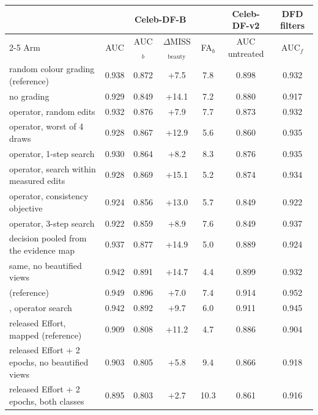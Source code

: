 \begin{tabular}{@{}l cccc c c@{}}
\toprule
 & \multicolumn{4}{c}{Celeb-DF-B} & Celeb-DF-v2 & DFD filters \\
\cmidrule(lr){2-5}
Arm & AUC & AUC$_b$ & $\Delta$MISS$_\text{beauty}$ & FA$_b$ & AUC untreated & AUC$_f$ \\
\midrule
random colour grading (reference) & 0.938 & 0.872 & +7.5 & 7.8 & 0.898 & 0.932 \\
no grading & 0.929 & 0.849 & +14.1 & 7.2 & 0.880 & 0.917 \\
operator, random edits & 0.932 & 0.876 & +7.9 & 7.7 & 0.873 & 0.932 \\
operator, worst of 4 draws & 0.928 & 0.867 & +12.9 & 5.6 & 0.860 & 0.935 \\
operator, 1-step search & 0.930 & 0.864 & +8.2 & 8.3 & 0.876 & 0.935 \\
operator, search within measured edits & 0.928 & 0.869 & +15.1 & 5.2 & 0.874 & 0.934 \\
operator, consistency objective & 0.924 & 0.856 & +13.0 & 5.7 & 0.849 & 0.922 \\
operator, 3-step search & 0.922 & 0.859 & +8.9 & 7.6 & 0.849 & 0.937 \\
decision pooled from the evidence map & 0.937 & 0.877 & +14.9 & 5.0 & 0.889 & 0.924 \\
same, no beautified views & 0.942 & 0.891 & +14.7 & 4.4 & 0.899 & 0.932 \\
\midrule
\oursB{} (reference) & 0.949 & 0.896 & +7.0 & 7.4 & 0.914 & 0.952 \\
\oursB{}, operator search & 0.942 & 0.892 & +9.7 & 6.0 & 0.911 & 0.945 \\
\midrule
released Effort, mapped (reference) & 0.909 & 0.808 & +11.2 & 4.7 & 0.886 & 0.904 \\
released Effort + 2 epochs, no beautified views & 0.903 & 0.805 & +5.8 & 9.4 & 0.866 & 0.918 \\
released Effort + 2 epochs, both classes & 0.895 & 0.803 & +2.7 & 10.3 & 0.861 & 0.916 \\
\bottomrule
\end{tabular}
